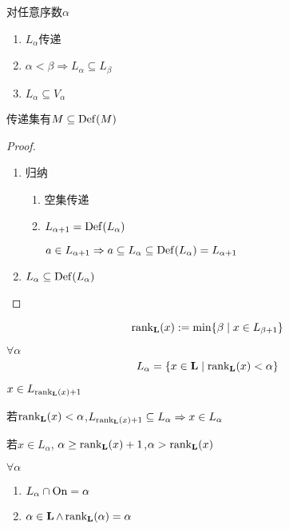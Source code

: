 \documentclass[11pt]{article}
\DeclareMathOperator{\rankl}{\rank_{\bL}}
\begin{document}
\begin{lemma}[]
对任意序数\(\alpha\)
\begin{enumerate}
\item \(L_\alpha\)传递
\item \(\alpha<\beta\Rightarrow L_\alpha\subseteq L_\beta\)
\item \(L_\alpha\subseteq V_\alpha\)
\end{enumerate}
\end{lemma}

传递集有\(M\subseteq\operatorname{Def}(M)\)

\begin{proof}
\begin{enumerate}
\item 归纳
\begin{enumerate}
\item 空集传递
\item \(L_{\alpha+1}=\operatorname{Def}(L_\alpha)\)

\(a\in L_{\alpha+1}\Rightarrow a\subseteq L_\alpha\subseteq\operatorname{Def}(L_\alpha)=L_{\alpha+1}\)
\end{enumerate}
\item \(L_\alpha\subseteq\operatorname{Def}(L_\alpha)\)
\end{enumerate}
\end{proof}

\begin{definition}[]
\begin{equation*}
\text{rank}_{\operatorname{\textbf{L}}}(x):=\min\{\beta\mid x\in L_{\beta+1}\}
\end{equation*}
\end{definition}

\begin{lemma}[]
\(\forall\alpha\)
\begin{equation*}
L_\alpha=\{x\in\operatorname{\textbf{L}}\mid\text{rank}_{\operatorname{\textbf{L}}}(x)<\alpha\}
\end{equation*}
\end{lemma}

\begin{definition}[]
\(x\in L_{\text{rank}_{\operatorname{\textbf{L}}}(x)+1}\)

若\(\rankl(x)<\alpha\),\(L_{\rankl(x)+1}\subseteq L_\alpha\Rightarrow x\in L_\alpha\)

若\(x\in L_\alpha\), \(\alpha\ge\rankl(x)+1\),\(\alpha>\rankl(x)\)
\end{definition}

\begin{lemma}[]
\(\forall\alpha\)
\begin{enumerate}
\item \(L_\alpha\cap\operatorname{On}=\alpha\)
\item \(\alpha\in\bL\wedge\rankl(\alpha)=\alpha\)
\end{enumerate}
\end{lemma}
\end{document}
